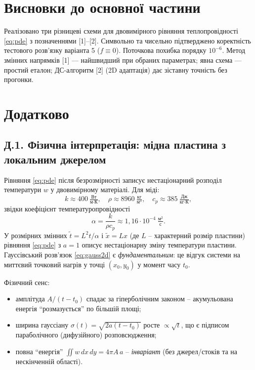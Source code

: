 \documentclass[12pt,a4paper]{article}
\begin{document}
\section{Висновки до основної частини}

Реалізовано три різницеві схеми для двовимірного рівняння теплопровідності \eqref{eq:pde} з позначеннями [1]--[2]. Символьно та чисельно підтверджено коректність тестового розв'язку варіанта 5 ($f\equiv 0$). Поточкова похибка порядку $10^{-6}$. Метод змінних напрямків [1] --- найшвидший при обраних параметрах; явна схема --- простий еталон; ДС-алгоритм [2] (2D адаптація) дає зіставну точність без прогонки.

\section*{Додатково}

\subsection*{Д.1. Фізична інтерпретація: мідна пластина з локальним джерелом}

Рівняння \eqref{eq:pde} після безрозмірності записує нестаціонарний розподіл температури $w$ у двовимірному матеріалі. Для міді:
\[
k \approx 400\ \tfrac{\text{Вт}}{\text{м}\cdot \text{К}},\quad
\rho \approx 8960\ \tfrac{\text{кг}}{\text{м}^3},\quad
c_p \approx 385\ \tfrac{\text{Дж}}{\text{кг}\cdot \text{К}},
\]
звідки коефіцієнт температуропровідності
\[
\alpha = \frac{k}{\rho c_p} \approx 1{,}16\cdot 10^{-4}\ \tfrac{\text{м}^2}{\text{с}}.
\]
У розмірних змінних $\tilde t = L^2 t/\alpha$ і $\tilde x = L x$ (де $L$ -- характерний розмір пластини) рівняння \eqref{eq:pde} з $a=1$ описує нестаціонарну зміну температури пластини. Гауссівський розв'язок \eqref{eq:gauss2d} є \emph{фундаментальним}: це відгук системи на миттєвий точковий нагрів у точці $(x_0,y_0)$ у момент часу $t_0$.

Фізичний сенс:
\begin{itemize}
  \item амплітуда $A/(t-t_0)$ спадає за гіперболічним законом -- акумульована енергія ``розмазується'' по більшій площі;
  \item ширина гауссіану $\sigma(t)=\sqrt{2a(t-t_0)}$ росте $\propto \sqrt{t}$, що є підписом параболічного (дифузійного) розповсюдження;
  \item повна ``енергія'' $\iint w\,dx\,dy = 4\pi A\,a$ -- \emph{інваріант} (без джерел/стоків та на нескінченній області).
\end{itemize}
\end{document}
